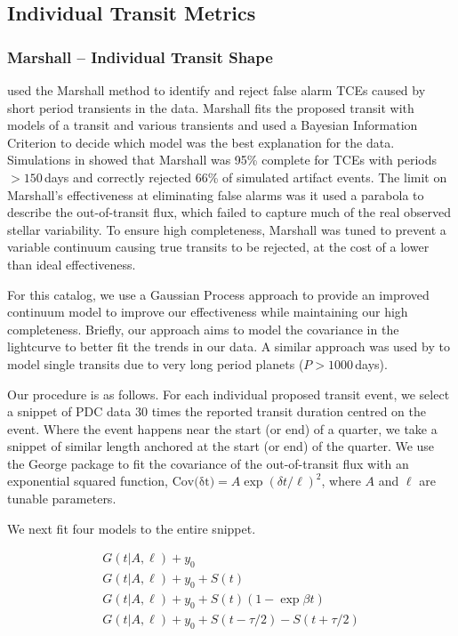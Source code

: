
\subsection{Individual Transit Metrics}

\subsubsection{Marshall -- Individual Transit Shape}

\citet{Coughlin2016} used the Marshall method \citep{Mullally16} to identify and reject false alarm TCEs caused by short period transients in the data. Marshall fits the proposed transit with models of a transit and various transients and used a Bayesian Information Criterion to decide which model was the best explanation for the data. Simulations in \citet{Mullally16} showed that Marshall was 95\% complete for TCEs with periods $>150$\,days and correctly rejected 66\% of simulated artifact events. The limit on Marshall's effectiveness at eliminating false alarms was it used a parabola to describe the out-of-transit flux, which failed to capture much of the real observed stellar variability. To ensure high completeness, Marshall was tuned to prevent a variable continuum causing true transits to be rejected, at the cost of a lower than ideal effectiveness.

For this catalog, we use a Gaussian Process approach \citep[GP][]{Rasmussen10} to provide an improved continuum model to improve our effectiveness while maintaining our high completeness. Briefly, our approach aims to model the covariance in the lightcurve to better fit the trends in our data.
A similar approach was used by \citet{ForemanMackey16} to model single transits due to very long period planets ($P > 1000$\,days).

Our procedure is as follows. For each individual proposed transit event, we select a snippet of PDC data 30 times the reported transit duration centred on the event. Where the event happens near the start (or end) of a quarter, we take a snippet of similar length anchored at the start (or end) of the quarter. We use the George package \citep{Ambikasaran14} to fit the covariance of the out-of-transit flux with an exponential squared function, $ {\mathrm{Cov(\delta t})} = A \exp{ (\delta t/\ell)^2}$, where $A$ and $\ell$ are tunable parameters. 

We next fit four models to the entire snippet.

\begin{equation}
\left.\begin{aligned}
G(t | A, \ell) + y_0 \\
G(t | A, \ell) + y_0 + S(t)\\
G(t | A, \ell) + y_0 + S(t)(1 - \exp{\beta t})\\
G(t | A, \ell) + y_0 + S(t - \tau/2) - S(t + \tau/2) 
\end{aligned}\right.
\end{equation}

